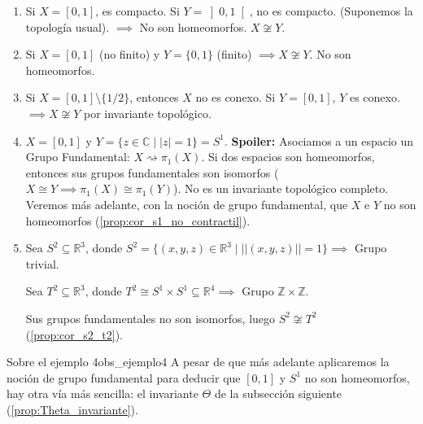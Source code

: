\begin{enumerate}
    \item Si $X = [0,1]$, es compacto. Si $Y = \left]0,1\right[$, no es compacto. (Suponemos la topología usual). $\implies$ No son homeomorfos. $X \not\cong Y$.
    \item Si $X = [0,1]$ (no finito) y $Y = \{0,1\}$ (finito) $\implies X \not\cong Y$. No son homeomorfos.
    \item Si $X = [0,1] \setminus \{1/2\}$, entonces $X$ no es conexo. Si $Y = [0,1]$, $Y$ es conexo. $\implies X \not\cong Y$ por invariante topológico.
    \item $X = [0,1]$ y $Y = \{z \in \mathbb{C} \mid |z| = 1\} = S^1$.
    \textbf{Spoiler:} Asociamos a un espacio un Grupo Fundamental: $X \rightsquigarrow \pi_1(X)$. Si dos espacios son homeomorfos, entonces sus grupos fundamentales son isomorfos ($X \cong Y \implies \pi_1(X) \cong \pi_1(Y)$). No es un invariante topológico completo. Veremos más adelante, con la noción de grupo fundamental, que $X$ e $Y$ no son homeomorfos (\cref{prop:cor_s1_no_contractil}).
    \item Sea $S^2 \subseteq \mathbb{R}^3$, donde $S^2 = \{(x,y,z) \in \mathbb{R}^3 \mid ||(x,y,z)|| = 1\} \implies$ Grupo trivial.
    
    \begin{center}
    \end{center}
    
    Sea $T^2 \subseteq \mathbb{R}^3$, donde $T^2 \cong S^1 \times S^1 \subseteq \mathbb{R}^4 \implies$ Grupo $\mathbb{Z} \times \mathbb{Z}$.
    
    \begin{center}
    \end{center}
    
    Sus grupos fundamentales no son isomorfos, luego $S^2 \not\cong T^2$ (\cref{prop:cor_s2_t2}).
\end{enumerate}

\begin{observacion}{Sobre el ejemplo 4}{obs_ejemplo4}
A pesar de que más adelante aplicaremos la noción de grupo fundamental para deducir que $[0,1]$ y $S^1$ no son homeomorfos, hay otra vía más sencilla: el invariante $\Theta$ de la subsección siguiente (\cref{prop:Theta_invariante}).
\end{observacion}

